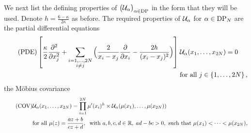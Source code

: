 \documentclass[oneside,english]{amsart}
\numberwithin{equation}{section}
\numberwithin{figure}{section}
\theoremstyle{plain}
\theoremstyle{plain}
\theoremstyle{plain}
\theoremstyle{remark}
\theoremstyle{plain}
\theoremstyle{plain}
\theoremstyle{plain}
\theoremstyle{plain}
\theoremstyle{plain}
\theoremstyle{plain}
\theoremstyle{plain}
\theoremstyle{plain}
\newcommand{\alexmod}[1]{{\color{allucol} #1}}
\newcommand{\blue}[1]{{\color{blue} #1}}
\newcommand{\red}[1]{{\color{red} #1}}
\begin{document}


We next list the defining properties of
$\big(\mathcal{U}_\alpha\big)_{\alpha \in \mathrm{DP}}$ in the form that they will be used.
Denote $h = \frac{6-\kappa}{2\kappa}$ as before.
The required properties of $\mathcal{U}_\alpha$ for $\alpha \in \mathrm{DP}_N$
are the partial differential equations
\begin{align}
\label{eq: PDE for conformal blocks} \tag{PDE} 
\left[ \frac{\kappa}{2} \frac{\partial^{2}}{\partial x_j^{2}}
    + \sum_{\substack{i=1,\ldots,2N \\ i\neq j}} \Big( \frac{2}{x_i-x_j} \frac{\partial}{\partial x_i} - \frac{2 h}{(x_i-x_j)^2} \Big) \right] \; & \mathcal{U}_\alpha (x_1 , \ldots, x_{2N}) = 0 \\
\nonumber
& \text{for all } j \in \left\{ 1,\ldots,2N\right\} ,
\end{align}
the M\"obius covariance
\begin{align}
\label{eq: COV for conformal blocks} \tag{COV} 
& \mathcal{U}_\alpha(x_1 , \ldots, x_{2N}) = 
    \prod_{i=1}^{2 N} \mu'(x_i)^{h} \times \mathcal{U}_\alpha (\mu(x_1) , \ldots, \mu(x_{2N}))  \\
\nonumber
& \text{for all } \mu(z) = \frac{a z + b}{c z + d}, \; \text{ with } a,b,c,d \in \mathbb{R}, \; ad-bc > 0, 
 \text{ such that } \mu(x_1) < \cdots < \mu(x_{2N}) ,
\end{align}
\end{document}
